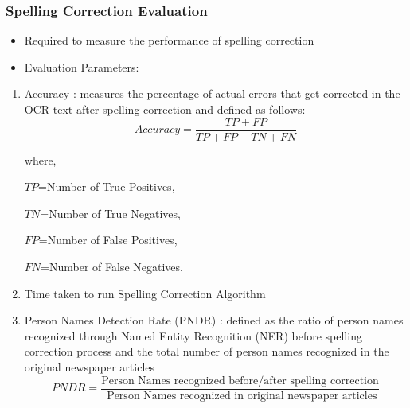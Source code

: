 \documentclass{beamer}
\begin{document}
\begin{frame}[allowframebreaks]
\frametitle{Spelling Correction Evaluation}

\begin{itemize}
\item
Required to measure the performance of spelling correction\\ \vspace{0.2in}
\item
Evaluation Parameters:
\end{itemize}
\begin{enumerate}
\item \alert{ Accuracy} : measures the percentage of actual errors that get corrected in the OCR text after spelling correction and defined as follows:
$$Accuracy=  \dfrac{TP+FP} {TP+ FP + TN + FN}$$


where, 

$TP$=Number of True Positives,

$TN$=Number of True Negatives,

 $FP$=Number of False Positives,

 $FN$=Number of False Negatives.



\item \alert{Time taken} to run Spelling Correction Algorithm
\item \alert{Person Names Detection Rate} (PNDR) : defined as the ratio of person names recognized through Named Entity Recognition (NER) before spelling correction process and the total number of person names recognized in the original newspaper articles
$$PNDR=\dfrac{ \text{Person Names recognized before/after spelling correction}} {\text{ Person Names recognized in original newspaper articles}} $$
\end{enumerate}
\end{frame}
\end{document}
